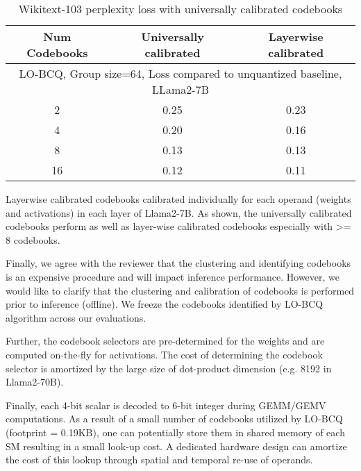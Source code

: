 \begin{table}[h]
\centering
\begin{tabular}{|c|c|c|} 
\hline
Num Codebooks &  Universally calibrated & Layerwise calibrated  \\
\hline
\hline
  \multicolumn{3}{c}{LO-BCQ, Group size=64, Loss compared to unquantized baseline, LLama2-7B} \\ 
 \hline
2 & 0.25 & 0.23  \\
\hline
4 &	0.20 &	0.16  \\
\hline
8 &	0.13 &	0.13  \\
\hline
16 & 0.12 &	0.11  \\
\hline
 \end{tabular}
    \caption{Wikitext-103 perplexity loss with universally calibrated codebooks}
    \label{tab:rom_ram}
\end{table}

Layerwise calibrated codebooks calibrated individually for each operand (weights and activations) in each layer of Llama2-7B. As shown, the universally calibrated codebooks perform as well as layer-wise calibrated codebooks especially with >= 8 codebooks. 

Finally, we agree with the reviewer that the clustering and identifying codebooks is an expensive procedure and will impact inference performance. However, we would like to clarify that the clustering and calibration of codebooks is performed prior to inference (offline). We freeze the codebooks identified by LO-BCQ algorithm across our evaluations. 

Further, the codebook selectors are pre-determined for the weights and are computed on-the-fly for activations. The cost of determining the codebook selector is amortized by the large size of dot-product dimension (e.g. 8192 in Llama2-70B). 

Finally, each 4-bit scalar is decoded to 6-bit integer during GEMM/GEMV computations. As a result of a small number of codebooks utilized by LO-BCQ (footprint = 0.19KB), one can potentially store them in shared memory of each SM resulting in a small look-up cost. A dedicated hardware design can amortize the cost of this lookup through spatial and temporal re-use of operands.
